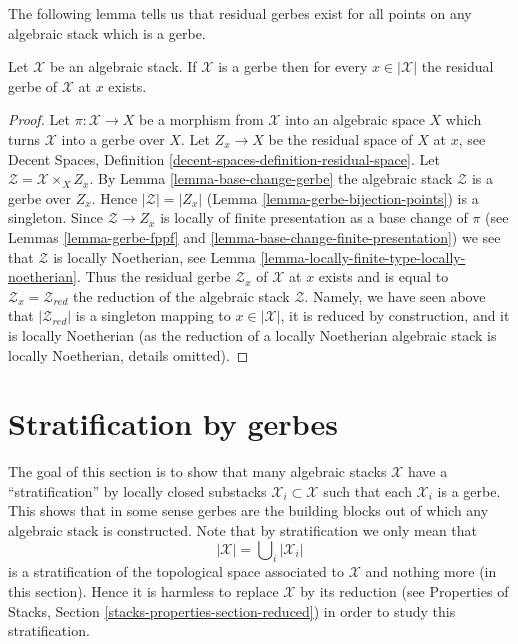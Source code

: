 \noindent
The following lemma tells us that residual gerbes exist for all points
on any algebraic stack which is a gerbe.

\begin{lemma}
\label{lemma-gerbe-residual-gerbe-exists}
Let $\mathcal{X}$ be an algebraic stack. If $\mathcal{X}$ is a gerbe
then for every $x \in |\mathcal{X}|$ the residual gerbe of $\mathcal{X}$
at $x$ exists.
\end{lemma}

\begin{proof}
Let $\pi : \mathcal{X} \to X$ be a morphism from $\mathcal{X}$ into
an algebraic space $X$ which turns $\mathcal{X}$ into a gerbe over $X$.
Let $Z_x \to X$ be the residual space of $X$ at $x$, see
Decent Spaces, Definition \ref{decent-spaces-definition-residual-space}.
Let $\mathcal{Z} = \mathcal{X} \times_X Z_x$. By
Lemma \ref{lemma-base-change-gerbe}
the algebraic stack $\mathcal{Z}$ is a gerbe over $Z_x$.
Hence $|\mathcal{Z}| = |Z_x|$
(Lemma \ref{lemma-gerbe-bijection-points})
is a singleton. Since $\mathcal{Z} \to Z_x$ is locally of finite presentation
as a base change of $\pi$ (see
Lemmas \ref{lemma-gerbe-fppf} and \ref{lemma-base-change-finite-presentation})
we see that $\mathcal{Z}$ is locally Noetherian, see
Lemma \ref{lemma-locally-finite-type-locally-noetherian}.
Thus the residual gerbe $\mathcal{Z}_x$ of $\mathcal{X}$ at $x$
exists and is equal to $\mathcal{Z}_x = \mathcal{Z}_{red}$ the reduction
of the algebraic stack $\mathcal{Z}$. Namely, we have seen above
that $|\mathcal{Z}_{red}|$ is a singleton mapping to $x \in |\mathcal{X}|$,
it is reduced by construction, and it is locally Noetherian (as the
reduction of a locally Noetherian algebraic stack is locally Noetherian,
details omitted).
\end{proof}









\section{Stratification by gerbes}
\label{section-stratify}

\noindent
The goal of this section is to show that many algebraic stacks
$\mathcal{X}$ have a ``stratification'' by locally closed substacks
$\mathcal{X}_i \subset \mathcal{X}$ such that each $\mathcal{X}_i$ is
a gerbe. This shows that in some sense gerbes are the building blocks
out of which any algebraic stack is constructed. Note that by stratification
we only mean that
$$
|\mathcal{X}| = \bigcup\nolimits_i |\mathcal{X}_i|
$$
is a stratification of the topological space associated to $\mathcal{X}$
and nothing more (in this section). Hence it is harmless to replace
$\mathcal{X}$ by its reduction (see
Properties of Stacks, Section \ref{stacks-properties-section-reduced})
in order to study this stratification.

